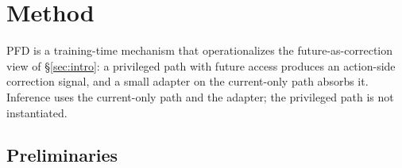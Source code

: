\documentclass{article}
\begin{document}


\section{Method}
\label{sec:method}

PFD is a training-time mechanism that operationalizes the future-as-correction view of \S\ref{sec:intro}: a privileged path with future access produces an action-side correction signal, and a small adapter on the current-only path absorbs it. Inference uses the current-only path and the adapter; the privileged path is not instantiated.

\subsection{Preliminaries}
\label{sec:method:prelim}
\end{document}
